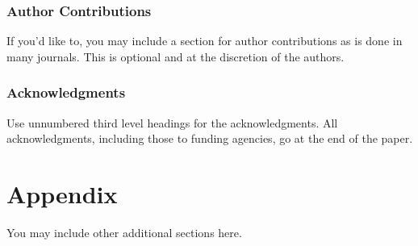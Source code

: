 \documentclass{article} %
\begin{document}
\subsubsection*{Author Contributions}
If you'd like to, you may include  a section for author contributions as is done
in many journals. This is optional and at the discretion of the authors.

\subsubsection*{Acknowledgments}
Use unnumbered third level headings for the acknowledgments. All
acknowledgments, including those to funding agencies, go at the end of the paper.





\appendix
\section{Appendix}
You may include other additional sections here.
\end{document}
